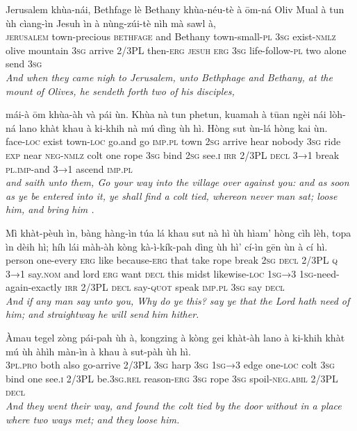 \documentclass[11pt,a4paper]{article}
\begin{document}
\begin{exe}
\gll Jerusalem khùa-nái, Bethfage lè Bethany khùa-néu-tè à ōm-ná Oliv Mual à tun ùh cìang-ìn Jesuh ìn à nùng-zúi-tè nìh mà sawl à, \\
     \textsc{jerusalem} town-precious \textsc{bethfage} and Bethany town-small-\textsc{pl} \textsc{3sg} exist-\textsc{nmlz} olive mountain \textsc{3sg} arrive 2/3PL then-\textsc{erg} \textsc{jesuh} \textsc{erg} \textsc{3sg} life-follow-\textsc{pl} two alone send \textsc{3sg} \\
\glt \textcolor{kjvcolor}{\textit{And when they came nigh to Jerusalem, unto Bethphage and Bethany, at the mount of Olives, he sendeth forth two of his disciples,}}

\gll mái-à ōm khùa-àh và pái ùn. Khùa nà tun phetun, kuamah à tūan ngèi nái lòh-ná lano khàt khau à ki-khih nà mú dìng ùh hì. Hòng sut ùn-lá hòng kai ùn. \\
     face-\textsc{loc} exist town-\textsc{loc} go.and go \textsc{imp}.\textsc{pl} town \textsc{2sg} arrive hear nobody \textsc{3sg} ride \textsc{exp} near \textsc{neg}-\textsc{nmlz} colt one rope \textsc{3sg} bind \textsc{2sg} see.\textsc{i} \textsc{irr} 2/3PL \textsc{decl} \textsc{3→1} break \textsc{pl}.\textsc{imp}-and \textsc{3→1} ascend \textsc{imp}.\textsc{pl} \\
\glt \textcolor{kjvcolor}{\textit{and saith unto them, Go your way into the village over against you: and as soon as ye be entered into it, ye shall find a colt tied, whereon never man sat; loose him, and bring him .}}

\gll Mì khàt-pèuh ìn, bàng hàng-ìn túa lá khau sut nà hì ùh hìam' hòng cìh lèh, topa ìn dèih hì; híh lái màh-àh kòng kà-ì-kík-pah dìng ùh hì' cí-ìn gēn ùn à cí hì. \\
     person one-every \textsc{erg} like because-\textsc{erg} that take rope break \textsc{2sg} \textsc{decl} 2/3PL \textsc{q} \textsc{3→1} say.\textsc{nom} and lord \textsc{erg} want \textsc{decl} this midst likewise-\textsc{loc} \textsc{1sg→3} \textsc{1sg}-need-again-exactly \textsc{irr} 2/3PL \textsc{decl} say-\textsc{quot} speak \textsc{imp}.\textsc{pl} \textsc{3sg} say \textsc{decl} \\
\glt \textcolor{kjvcolor}{\textit{And if any man say unto you, Why do ye this? say ye that the Lord hath need of him; and straightway he will send him hither.}}

\gll Àmau tegel zòng pái-pah ùh à, kongzing à kòng gei khàt-àh lano à ki-khih khàt mú ùh àhìh màn-ìn à khau à sut-pàh ùh hì. \\
     \textsc{3pl}.\textsc{pro} both also go-arrive 2/3PL \textsc{3sg} harp \textsc{3sg} \textsc{1sg→3} edge one-\textsc{loc} colt \textsc{3sg} bind one see.\textsc{i} 2/3PL be.\textsc{3sg}.\textsc{rel} reason-\textsc{erg} \textsc{3sg} rope \textsc{3sg} spoil-\textsc{neg}.\textsc{abil} 2/3PL \textsc{decl} \\
\glt \textcolor{kjvcolor}{\textit{And they went their way, and found the colt tied by the door without in a place where two ways met; and they loose him.}}


\end{exe}
\end{document}
